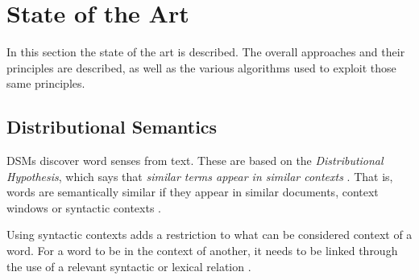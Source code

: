 \chapter{State of the Art}
\label{ch:stateofart}

In this section the state of the art is described. The overall approaches and
their principles are described, as well as the various algorithms used to
exploit those same principles.

\section{Distributional Semantics}

\acp{DSM} discover word senses from text. These are based on the
\textit{Distributional Hypothesis}, which says that \textit{similar terms
appear in similar contexts} \cite{curran2004distributional}. That is, words are
semantically similar if they appear in similar documents, context windows or
syntactic contexts \cite{van2010mining}.

Using syntactic contexts adds a restriction to what can be considered context of
a word. For a word to be in the context of another, it needs to be linked
through the use of a relevant syntactic or lexical relation
\cite{baroni2010distributional}.







